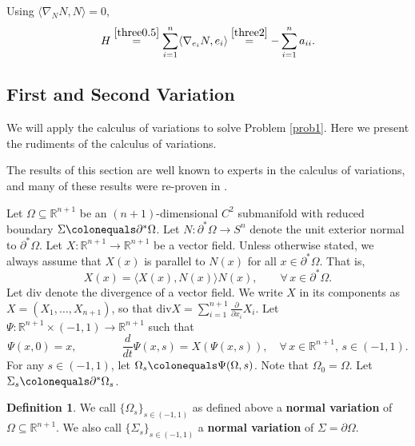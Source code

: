 \documentclass[12pt,reqno]{amsart}
\theoremstyle{definition}
\newtheorem{definition}[theorem]{Definition}
\renewcommand{\subset}{\subseteq}
\newcommand{\R}{\mathbb{R}}
\newcommand{\embolden}[1]{\textbf {#1}}
\newcommand{\redA}{\partial^{*}\Omega}
\newcommand{\redb}{\partial^{*}}
\newcommand{\sdimn}{n}
\newcommand{\adimn}{n+1}
\begin{document}

Using $\langle\nabla_{N}N,N\rangle=0$,
\begin{equation}\label{three4}
H\stackrel{\eqref{three0.5}}{=}\sum_{i=1}^{\sdimn}\langle \nabla_{e_{i}} N,e_{i}\rangle
\stackrel{\eqref{three2}}{=}-\sum_{i=1}^{\sdimn}a_{ii}.
\end{equation}


\subsection{First and Second Variation}

We will apply the calculus of variations to solve Problem \ref{prob1}. Here we present the rudiments of the calculus of variations.

The results of this section are well known to experts in the calculus of variations, and many of these results were re-proven in \cite{barchiesi16}.


Let $\Omega\subset\R^{\adimn}$ be an $(\adimn)$-dimensional $C^{2}$ submanifold with reduced boundary $\Sigma\colonequals\redA$.  Let $N\colon\redA\to S^{\sdimn}$ denote the unit exterior normal to $\redA$.  Let $X\colon\R^{\adimn}\to\R^{\adimn}$ be a vector field.  Unless otherwise stated, we always assume that $X(x)$ is parallel to $N(x)$ for all $x\in\redA$.  That is,
\begin{equation}\label{nine2.4}
X(x)=\langle X(x),N(x)\rangle N(x),\qquad\forall\, x\in\redA.
\end{equation}
Let $\mathrm{div}$ denote the divergence of a vector field.  We write $X$ in its components as $X=(X_{1},\ldots,X_{\adimn})$, so that $\mathrm{div}X=\sum_{i=1}^{\adimn}\frac{\partial}{\partial x_{i}}X_{i}$.  Let $\Psi\colon\R^{\adimn}\times(-1,1)\to\R^{\adimn}$ such that
\begin{equation}\label{nine2.3}
\Psi(x,0)=x,\qquad\qquad\frac{d}{dt}\Psi(x,s)=X(\Psi(x,s)),\quad\forall\,x\in\R^{\adimn},\,s\in(-1,1).
\end{equation}
For any $s\in(-1,1)$, let $\Omega_{s}\colonequals\Psi(\Omega,s)$.  Note that $\Omega_{0}=\Omega$.  Let $\Sigma_{s}\colonequals\redb\Omega_{s}$.
\begin{definition}
We call $\{\Omega_{s}\}_{s\in(-1,1)}$ as defined above a \embolden{normal variation} of $\Omega\subset\R^{\adimn}$.  We also call $\{\Sigma_{s}\}_{s\in(-1,1)}$ a \embolden{normal variation} of $\Sigma=\partial\Omega$.
\end{definition}
\end{document}
